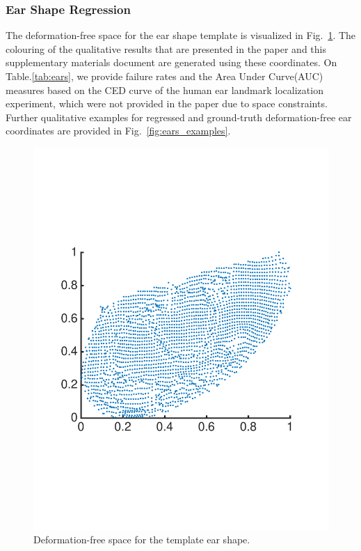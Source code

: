 \subsubsection{Ear Shape Regression}

The deformation-free space for the ear shape template is visualized in Fig.~\ref{fig:earpoints}. The colouring of the qualitative results that are presented in the paper and this supplementary materials document are generated using these coordinates. On Table.\ref{tab:ears}, we provide failure rates and the Area Under Curve(AUC) measures based on the CED curve of the human ear landmark localization experiment, which were not provided in the paper due to space constraints. Further qualitative examples for regressed and ground-truth deformation-free ear coordinates are provided in Fig.~\ref{fig:ears_examples}.


\begin{figure}[h]
\centering
  \includegraphics[trim={3.1cm 8cm 0.35cm 7.3cm},width=0.7\linewidth]{resources/Human_Poses/EarPoints}
\caption{ Deformation-free space for the template ear shape. }
\label{fig:earpoints}
\end{figure}


